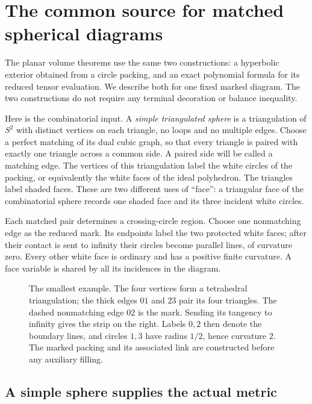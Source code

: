 \chapter{The common source for matched spherical diagrams}
\label{app:morse-preliminaries}

The planar volume theorems use the same two constructions: a hyperbolic
exterior obtained from a circle packing, and an exact polynomial formula
for its reduced tensor evaluation. We describe both for one fixed marked
diagram. The two constructions do not require any terminal decoration or
balance inequality.

Here is the combinatorial input. A \emph{simple triangulated sphere} is
a triangulation of $S^2$ with distinct vertices on each triangle, no
loops and no multiple edges. Choose a perfect matching of its dual
cubic graph, so that every triangle is paired with exactly one triangle
across a common side. A paired side will be called a matching edge.
The vertices of this triangulation label the white circles of the
packing, or equivalently the white faces of the ideal polyhedron.
The triangles label shaded faces. These are two different uses of
``face'': a triangular face of the combinatorial sphere records one
shaded face and its three incident white circles.

Each matched pair determines a crossing-circle region. Choose one
nonmatching edge as the reduced mark. Its endpoints label the two
protected white faces; after their contact is sent to infinity their
circles become parallel lines, of curvature zero. Every other white
face is ordinary and has a positive finite curvature. A face variable
is shared by all its incidences in the diagram.

\begin{figure}[ht]
\centering

\caption{The smallest example. The four vertices form a tetrahedral
triangulation; the thick edges $01$ and $23$ pair its four triangles.
The dashed nonmatching edge $02$ is the mark. Sending its tangency to
infinity gives the strip on the right. Labels $0,2$ then denote the
boundary lines, and circles $1,3$ have radius $1/2$, hence curvature
$2$. The marked packing and its associated link are constructed before
any auxiliary filling.}
\label{fig:morse-matched-sphere}
\end{figure}

\section{A simple sphere supplies the actual metric}\label{bl:a-simple-sphere-supplies-the-actual-metric}


